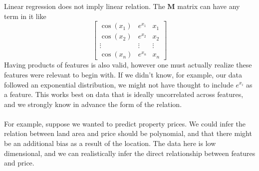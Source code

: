 \documentclass[11pt]{article}
\begin{document}
\noindent Linear regression does not imply linear relation. The \(\mathbf{M}\) matrix can have any term in it like
\[
    \begin{bmatrix}
    \cos(x_1) & e^{x_1} & x_1\\
    \cos(x_2) & e^{x_2} & x_2\\
    \vdots & \vdots & \vdots \\
    \cos(x_n) & e^{x_n} & x_n
    \end{bmatrix}
\]
\noindent Having products of features is also valid, however one must actually realize these features were relevant to begin with. If we didn't know, for example, our data
followed an exponential distribution, we might not have thought to include \(e^{x_i}\) as a feature. This works best on data that is ideally uncorrelated across features, and
we strongly know in advance the form of the relation.
\\
\\
For example, suppose we wanted to predict property prices. We could infer the relation between land area and price should be polynomial, and that there might be an additional bias
as a result of the location. The data here is low dimensional, and we can realistically infer the direct relationship between features and price.
\end{document}
